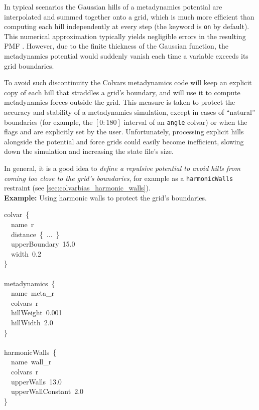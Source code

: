 
In typical scenarios the Gaussian hills of a metadynamics potential are interpolated and summed together onto a grid, which is much more efficient than computing each hill independently at every step (the keyword  is \texttt{on} by default).
This numerical approximation typically yields negligible errors in the resulting PMF \cite{Fiorin2013}.
However, due to the finite thickness of the Gaussian function, the metadynamics potential would suddenly vanish each time a variable exceeds its grid boundaries.

To avoid such discontinuity the Colvars metadynamics code will keep an explicit copy of each hill that straddles a grid's boundary, and will use it to compute metadynamics forces outside the grid.
This measure is taken to protect the accuracy and stability of a metadynamics simulation, except in cases of ``natural'' boundaries (for example, the $[0:180]$ interval of an \texttt{angle} colvar) or when the flags  and  are explicitly set by the user.
Unfortunately, processing explicit hills alongside the potential and force grids could easily become inefficient, slowing down the simulation and increasing the state file's size.

In general, it is a good idea to \emph{define a repulsive potential to avoid hills from coming too close to the grid's boundaries}, for example as a \texttt{harmonicWalls} restraint (see \ref{sec:colvarbias_harmonic_walls}).\\

\noindent\textbf{Example:} Using harmonic walls to protect the grid's boundaries.
\begin{cvexampleinput}
\-colvar~\{\\
\-\-~~name~r\\
\-\-~~distance~\{~...~\}\\
\-\-~~upperBoundary~15.0\\
\-\-~~width~0.2\\
\-\}\\
\\
\-metadynamics~\{\\
\-\-~~name~meta\_r\\
\-\-~~colvars~r\\
\-\-~~hillWeight~0.001\\
\-\-~~hillWidth~2.0\\
\-\}\\
\\
\-harmonicWalls~\{\\
\-\-~~name~wall\_r\\
\-\-~~colvars~r\\
\-\-~~upperWalls~13.0\\
\-\-~~upperWallConstant~2.0\\
\-\}
\end{cvexampleinput}

